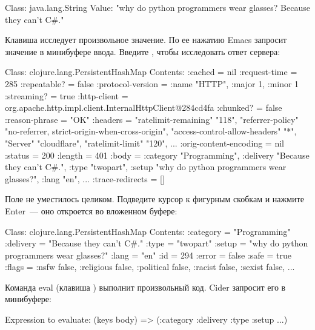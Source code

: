 \begin{english}
  \begin{text}
Class: java.lang.String
Value: "why do python programmers wear glasses? Because they can't C#."
  \end{text}
\end{english}

Клавиша  исследует произвольное значение. По ее нажатию Emacs запросит значение в минибуфере ввода. Введите , чтобы исследовать ответ сервера:

\begin{english}
  \begin{text}
Class: clojure.lang.PersistentHashMap
Contents:
  :cached = nil
  :request-time = 285
  :repeatable? = false
  :protocol-version = { :name "HTTP", :major 1, :minor 1 }
  :streaming? = true
  :http-client = org.apache.http.impl.client.InternalHttpClient@284cd4fa
  :chunked? = false
  :reason-phrase = "OK"
  :headers = { "ratelimit-remaining" "118", "referrer-policy" "no-referrer, strict-origin-when-cross-origin", "access-control-allow-headers" "*", "Server" "cloudflare", "ratelimit-limit" "120", ... }
  :orig-content-encoding = nil
  :status = 200
  :length = 401
  :body = { :category "Programming", :delivery "Because they can't C#.", :type "twopart", :setup "why do python programmers wear glasses?", :lang "en", ... }
  :trace-redirects = []
  \end{text}
\end{english}

Поле  не уместилось целиком. Подведите курсор к фигурным скобкам и нажмите Enter~--- оно откроется во вложенном буфере:

\begin{english}
  \begin{text}
Class: clojure.lang.PersistentHashMap
Contents:
  :category = "Programming"
  :delivery = "Because they can't C#."
  :type = "twopart"
  :setup = "why do python programmers wear glasses?"
  :lang = "en"
  :id = 294
  :error = false
  :safe = true
  :flags = { :nsfw false, :religious false, :political false, :racist false, :sexist false, ... }
  \end{text}
\end{english}

Команда eval (клавиша ) выполнит произвольный код. Cider запросит его в минибуфере:

\begin{english}
  \begin{text}
Expression to evaluate: (keys body)
=> (:category :delivery :type :setup ...)
  \end{text}
\end{english}

